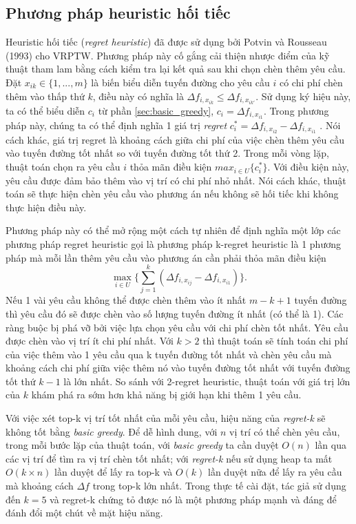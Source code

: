\subsection{Phương pháp heuristic hối tiếc}
Heuristic hối tiếc (\textit{regret heuristic}) đã được sử dụng bởi Potvin và Rousseau (1993) \cite{} cho VRPTW. Phương pháp này cố gắng cải thiện nhược điểm của kỹ thuật tham lam bằng cách kiểm tra lại kết quả sau khi chọn chèn thêm yêu cầu. Đặt $x_{ik} \in \{1, ..., m\}$ là biến biểu diễn tuyến đường cho yêu cầu $i$ có chi phí chèn thêm vào thấp thứ $k$, điều này có nghĩa là $\Delta f_{i, x_{ik}} \leqslant \Delta f_{i, x_{ik'}}$. Sử dụng ký hiệu này, ta có thể biểu diễn $c_i$ từ phần \ref{sec:basic_greedy}, $c_i = \Delta f_{i, x_{i1}}$. Trong phương pháp này, chúng ta có thể định nghĩa 1 giá trị \textit{regret} $c_i^* = \Delta f_{i, x_{i2}} - \Delta f_{i, x_{i1}}$ . Nói cách khác, giá trị regret là khoảng cách giữa chi phí của việc chèn thêm yêu cầu vào tuyến đường tốt nhất so với tuyến đường tốt thứ 2. Trong mỗi vòng lặp, thuật toán chọn ra yêu cầu $i$ thỏa mãn điều kiện $max_{i \in U} \{c_i^*\}$. Với điều kiện này, yêu cầu được đảm bảo thêm vào vị trí có chi phí nhỏ nhất. Nói cách khác, thuật toán sẽ thực hiện chèn yêu cầu vào phương án nếu không sẽ hối tiếc khi không thực hiện điều này.

Phương pháp này có thể mở rộng một cách tự nhiên để định nghĩa một lớp các phương pháp regret heuristic gọi là phương pháp k-regret heuristic là 1 phương pháp mà mỗi lần thêm yêu cầu vào phương án cần phải thỏa mãn điều kiện
\begin{equation}
    \max\limits_{i \in U} \{ \sum_{j=1}^k (\Delta f_{i, x_{ij}} - \Delta f_{i, x_{i1}}) \}.
\end{equation}
Nếu 1 vài yêu cầu không thể được chèn thêm vào ít nhất $m-k+1$ tuyến đường thì yêu cầu đó sẽ được chèn vào số lượng tuyến đường ít nhất (có thể là 1). Các ràng buộc bị phá vỡ bởi việc lựa chọn yêu cầu với chi phí chèn tốt nhất. Yêu cầu được chèn vào vị trí ít chi phí nhất. Với $k>2$ thì thuật toán sẽ tính toán chi phí của việc thêm vào 1 yêu cầu qua k tuyến đường tốt nhất và chèn yêu cầu mà khoảng cách chi phí giữa việc thêm nó vào tuyến đường tốt nhất với tuyến đường tốt thứ $k-1$ là lớn nhất. So sánh với 2-regret heuristic, thuật toán với giá trị lớn của $k$ khám phá ra sớm hơn khả năng bị giới hạn khi thêm 1 yêu cầu.

Với việc xét top-k vị trí tốt nhất của mỗi yêu cầu, hiệu năng của \textit{regret-k} sẽ không tốt bằng \textit{basic greedy}. Để dễ hình dung, với $n$ vị trí có thể chèn yêu cầu, trong mỗi bước lặp của thuật toán, với \textit{basic greedy} ta cần duyệt $O(n)$ lần qua các vị trí để tìm ra vị trí chèn tốt nhất; với \textit{regret-k} nếu sử dụng heap ta mất $O(k \times n)$ lần duyệt để  lấy ra top-k và $O(k)$ lần duyệt nữa để lấy ra yêu cầu mà khoảng cách $\Delta f$ trong top-k lớn nhất. Trong thực tế cài đặt, tác giả sử dụng đến $k=5$ và regret-k chứng tỏ được nó là một phương pháp mạnh và đáng để đánh đổi một chút về mặt hiệu năng. 